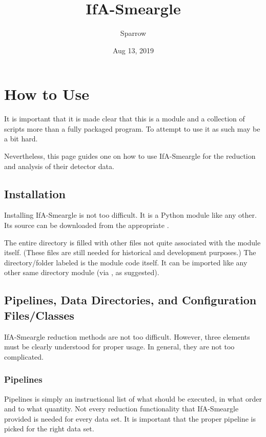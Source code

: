 \documentclass[letterpaper,10pt,english]{sphinxmanual}
\title{IfA-Smeargle}
\date{Aug 13, 2019}
\author{Sparrow}
\begin{document}
\pagestyle{empty}
\sphinxmaketitle
\pagestyle{plain}
\sphinxtableofcontents
\pagestyle{normal}
\label{\detokenize{index::doc}}



\chapter{How to Use}
\label{\detokenize{how_to_use:how-to-use}}\label{\detokenize{how_to_use::doc}}
It is important that it is made clear that this is a module and a collection
of scripts more than a fully packaged program. To attempt to use it as such
may be a bit hard.

Nevertheless, this page guides one on how to use IfA-Smeargle for the
reduction and analysis of their detector data.


\section{Installation}
\label{\detokenize{how_to_use:installation}}
Installing IfA-Smeargle is not too difficult. It is a Python module like any
other. Its source can be downloaded from the appropriate .

The entire directory is filled with other files not quite associated
with the module itself. (These files are still needed for historical and
development purposes.) The directory/folder labeled  is the
module code itself. It can be imported like any other same directory module
(via , as suggested).


\section{Pipelines, Data Directories, and Configuration Files/Classes}
\label{\detokenize{how_to_use:pipelines-data-directories-and-configuration-files-classes}}
IfA-Smeargle reduction methods are not too difficult. However,
three elements must be clearly understood for proper usage. In general, they
are not too complicated.


\subsection{Pipelines}
\label{\detokenize{how_to_use:pipelines}}
Pipelines is simply an instructional list of what should be executed, in
what order and to what quantity. Not every reduction functionality that
IfA-Smeargle provided is needed for every data set. It is important that
the proper pipeline is picked for the right data set.
\end{document}
